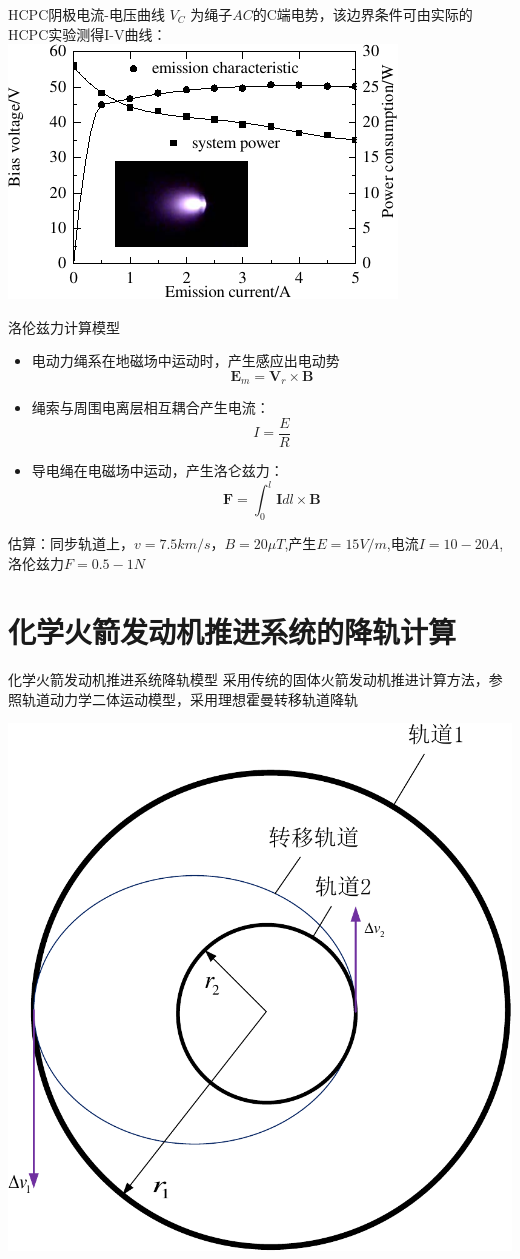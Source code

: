 \documentclass[sectioncirclenumberstyle]{le2iutbmbeamer}
\begin{document}
\begin{frame}{HCPC阴极电流-电压曲线}
$V_C$ 为绳子$AC$的C端电势，该边界条件可由实际的HCPC实验测得I-V曲线：
\centering
\includegraphics[width=0.9\linewidth]{figures/emissioncurrent}
\end{frame}

\begin{frame}{洛伦兹力计算模型}
\begin{itemize}
\item 电动力绳系在地磁场中运动时，产生感应出电动势
\[\bm{E}_m=\bm{V}_r \times\bm{B}\]
\item 绳索与周围电离层相互耦合产生电流：
\[I=\frac{E}{R}\]
\item 导电绳在电磁场中运动，产生洛仑兹力：
\[\bm{F}=\int_0^l  \bm{I}dl \times \bm{B}\]
\end{itemize}
估算：同步轨道上，$v=7.5\si{km/s}$，$B=20\si{\mu T}$,产生$E=15\si{V/m}$,电流$I=10-20\si{A}$,洛伦兹力$F=0.5-1N$
\end{frame}

\section{化学火箭发动机推进系统的降轨计算}
\tableofcontentslide[sectionstyle={show/shaded},subsectionstyle={show/show/hide},subsubsectionstyle={hide/hide/hide/hide}]
\begin{frame}{化学火箭发动机推进系统降轨模型}
采用传统的固体火箭发动机推进计算方法，参照轨道动力学二体运动模型，采用理想霍曼转移轨道降轨

\centering
\includegraphics[width=0.5\linewidth]{figures/Hoffmantansfer}
\end{frame}
\end{document}
